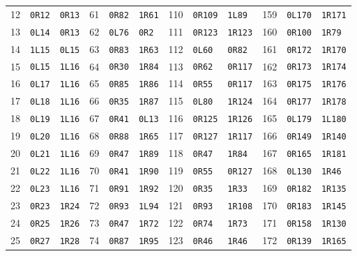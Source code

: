 \begin{center}
\begin{tabular}{@{}rll@{\quad}rll@{\quad}rll@{\quad}rll@{}}
12 & \texttt{0R12} & \texttt{0R13} & 61 & \texttt{0R82} & \texttt{1R61} & 110 & \texttt{0R109} & \texttt{1L89} & 159 & \texttt{0L170} & \texttt{1R171}\\
13 & \texttt{0L14} & \texttt{0R13} & 62 & \texttt{0L76} & \texttt{0R2} & 111 & \texttt{0R123} & \texttt{1R123} & 160 & \texttt{0R100} & \texttt{1R79}\\
14 & \texttt{1L15} & \texttt{0L15} & 63 & \texttt{0R83} & \texttt{1R63} & 112 & \texttt{0L60} & \texttt{0R82} & 161 & \texttt{0R172} & \texttt{1R170}\\
15 & \texttt{0L15} & \texttt{1L16} & 64 & \texttt{0R30} & \texttt{1R84} & 113 & \texttt{0R62} & \texttt{0R117} & 162 & \texttt{0R173} & \texttt{1R174}\\
16 & \texttt{0L17} & \texttt{1L16} & 65 & \texttt{0R85} & \texttt{1R86} & 114 & \texttt{0R55} & \texttt{0R117} & 163 & \texttt{0R175} & \texttt{1R176}\\
17 & \texttt{0L18} & \texttt{1L16} & 66 & \texttt{0R35} & \texttt{1R87} & 115 & \texttt{0L80} & \texttt{1R124} & 164 & \texttt{0R177} & \texttt{1R178}\\
18 & \texttt{0L19} & \texttt{1L16} & 67 & \texttt{0R41} & \texttt{0L13} & 116 & \texttt{0R125} & \texttt{1R126} & 165 & \texttt{0L179} & \texttt{1L180}\\
19 & \texttt{0L20} & \texttt{1L16} & 68 & \texttt{0R88} & \texttt{1R65} & 117 & \texttt{0R127} & \texttt{1R117} & 166 & \texttt{0R149} & \texttt{1R140}\\
20 & \texttt{0L21} & \texttt{1L16} & 69 & \texttt{0R47} & \texttt{1R89} & 118 & \texttt{0R47} & \texttt{1R84} & 167 & \texttt{0R165} & \texttt{1R181}\\
21 & \texttt{0L22} & \texttt{1L16} & 70 & \texttt{0R41} & \texttt{1R90} & 119 & \texttt{0R55} & \texttt{0R127} & 168 & \texttt{0L130} & \texttt{1R46}\\
22 & \texttt{0L23} & \texttt{1L16} & 71 & \texttt{0R91} & \texttt{1R92} & 120 & \texttt{0R35} & \texttt{1R33} & 169 & \texttt{0R182} & \texttt{1R135}\\
23 & \texttt{0R23} & \texttt{1R24} & 72 & \texttt{0R93} & \texttt{1L94} & 121 & \texttt{0R93} & \texttt{1R108} & 170 & \texttt{0R183} & \texttt{1R145}\\
24 & \texttt{0R25} & \texttt{1R26} & 73 & \texttt{0R47} & \texttt{1R72} & 122 & \texttt{0R74} & \texttt{1R73} & 171 & \texttt{0R158} & \texttt{1R130}\\
25 & \texttt{0R27} & \texttt{1R28} & 74 & \texttt{0R87} & \texttt{1R95} & 123 & \texttt{0R46} & \texttt{1R46} & 172 & \texttt{0R139} & \texttt{1R165}\\

\end{tabular}
\end{center}
